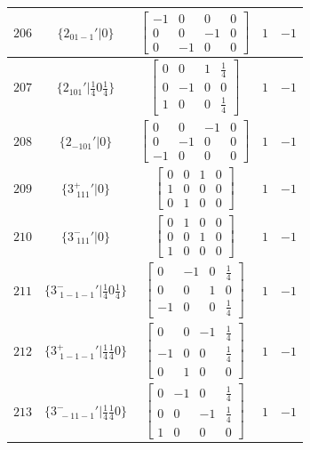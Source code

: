 \documentclass[fleqn,8pt]{jsarticle}
\begin{document}
\begin{longtable}{ccccc}
$ 206 $ & $ \{2{}_{01-1}{}'|0\} $ & $ \begin{bmatrix} -1 & 0 & 0 & 0 \\ 0 & 0 & -1 & 0 \\ 0 & -1 & 0 & 0 \end{bmatrix} $ & $ 1 $ & $ -1 $ \\ \hline
$ 207 $ & $ \{2{}_{101}{}'|\frac{1}{4} 0 \frac{1}{4}\} $ & $ \begin{bmatrix} 0 & 0 & 1 & \frac{1}{4} \\ 0 & -1 & 0 & 0 \\ 1 & 0 & 0 & \frac{1}{4} \end{bmatrix} $ & $ 1 $ & $ -1 $ \\ \hline
$ 208 $ & $ \{2{}_{-101}{}'|0\} $ & $ \begin{bmatrix} 0 & 0 & -1 & 0 \\ 0 & -1 & 0 & 0 \\ -1 & 0 & 0 & 0 \end{bmatrix} $ & $ 1 $ & $ -1 $ \\ \hline
$ 209 $ & $ \{3^{+}_{\,\,111}{}'|0\} $ & $ \begin{bmatrix} 0 & 0 & 1 & 0 \\ 1 & 0 & 0 & 0 \\ 0 & 1 & 0 & 0 \end{bmatrix} $ & $ 1 $ & $ -1 $ \\ \hline
$ 210 $ & $ \{3^{-}_{\,\,111}{}'|0\} $ & $ \begin{bmatrix} 0 & 1 & 0 & 0 \\ 0 & 0 & 1 & 0 \\ 1 & 0 & 0 & 0 \end{bmatrix} $ & $ 1 $ & $ -1 $ \\ \hline
$ 211 $ & $ \{3^{-}_{\,\,1-1-1}{}'|\frac{1}{4} 0 \frac{1}{4}\} $ & $ \begin{bmatrix} 0 & -1 & 0 & \frac{1}{4} \\ 0 & 0 & 1 & 0 \\ -1 & 0 & 0 & \frac{1}{4} \end{bmatrix} $ & $ 1 $ & $ -1 $ \\ \hline
$ 212 $ & $ \{3^{+}_{\,\,1-1-1}{}'|\frac{1}{4} \frac{1}{4} 0\} $ & $ \begin{bmatrix} 0 & 0 & -1 & \frac{1}{4} \\ -1 & 0 & 0 & \frac{1}{4} \\ 0 & 1 & 0 & 0 \end{bmatrix} $ & $ 1 $ & $ -1 $ \\ \hline
$ 213 $ & $ \{3^{-}_{\,\,-11-1}{}'|\frac{1}{4} \frac{1}{4} 0\} $ & $ \begin{bmatrix} 0 & -1 & 0 & \frac{1}{4} \\ 0 & 0 & -1 & \frac{1}{4} \\ 1 & 0 & 0 & 0 \end{bmatrix} $ & $ 1 $ & $ -1 $ \\ \hline

\end{longtable}
\end{document}
